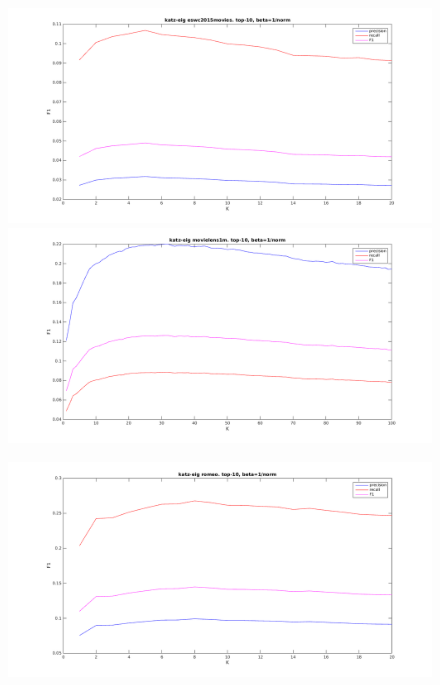 \begin{figure}[h!]
\centering
\begin{minipage}{.5\textwidth}
    \centering
    \includegraphics[width=\linewidth]{fig/katzeig_k/eswc2015movies_katzeig_K.png}
\end{minipage}%
\begin{minipage}{.5\textwidth}
    \centering
    \includegraphics[width=\linewidth]{fig/katzeig_k/movielens_katzeig_K.png}
\end{minipage}
\end{figure}

\begin{figure}[h!]
\begin{minipage}{.5\textwidth}
    \includegraphics[width=\linewidth]{fig/katzeig_k/romeo_katzeig_K.png}
\end{minipage}%
\end{figure}

\FloatBarrier
